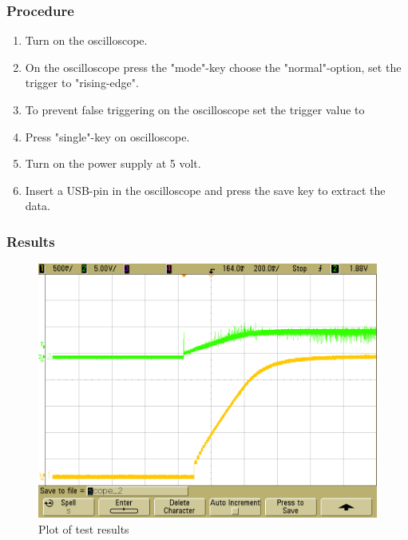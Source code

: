 \subsubsection{Procedure}

\begin{enumerate}
  \item Turn on the oscilloscope.
  \item On the oscilloscope press the "mode"-key choose the "normal"-option, set the trigger to "rising-edge".
  \item To prevent false triggering on the oscilloscope set the trigger value to %
  \item Press "single"-key on oscilloscope.
  \item Turn on the power supply at 5 volt.
  \item Insert a USB-pin in the oscilloscope and press the save key to extract the data.
\end{enumerate}

\subsubsection{Results}
\begin{figure}[H]
	\centering
	\includegraphics[scale=.4]{figures/Exercise8}
	\caption{Plot of test results}
\end{figure}
